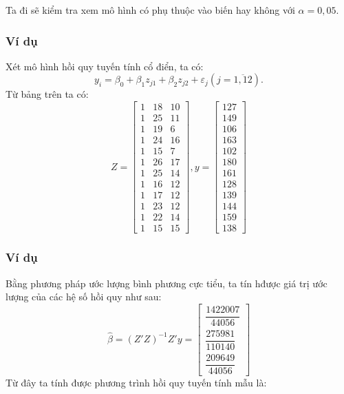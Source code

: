 \begin{footnotesize}
\begin{frame}
{\begin{center}
\begin{tabular}{|c|c|c|c|}
	   \end{tabular}
        \end{center}}
        Ta đi sẽ kiểm tra xem mô hình có phụ thuộc vào biến hay không với $\alpha = 0,05$.
\end{frame}
\begin{frame}
\frametitle{Ví dụ}
Xét mô hình hồi quy tuyến tính cổ điển, ta có: 
\[
y_i = \beta_0 + \beta_1z_{j1} + \beta_2z_{j2} + \varepsilon_j (j=\overline{1,12}).
\]
Từ bảng trên ta có:\\
\[
Z = \begin{bmatrix}
1 & 18 & 10 \\
1 & 25 & 11 \\
1 & 19 & 6 \\
1 & 24 & 16 \\
1 & 15 & 7 \\
1 & 26 & 17 \\
1 & 25 & 14 \\
1 & 16 & 12 \\
1 & 17 & 12 \\
1 & 23 & 12 \\
1 & 22 & 14 \\
1 & 15 & 15
\end{bmatrix}, y = \begin{bmatrix}
    127 \\ 149 \\ 106 \\ 163\\ 102 \\ 180\\ 161\\128\\139\\144\\159\\138
\end{bmatrix}
\]
\end{frame}
\begin{frame}
\frametitle{Ví dụ}
Bằng phương pháp ước lượng bình phương cực tiểu, ta tín hđược giá trị ước lượng của các hệ số hồi quy
 như sau:\\
 \[
 \widehat{\beta} = (Z'Z)^{-1}Z'y = \begin{bmatrix}
     \dfrac{1422007}{44056}\\[0,5cm] \dfrac{275981}{110140}\\[0,5cm] \dfrac{209649}{44056}
 \end{bmatrix}
 \]
 Từ đây ta tính được phương trình hồi quy tuyến tính mẫu là:

\end{frame}
\end{footnotesize}
